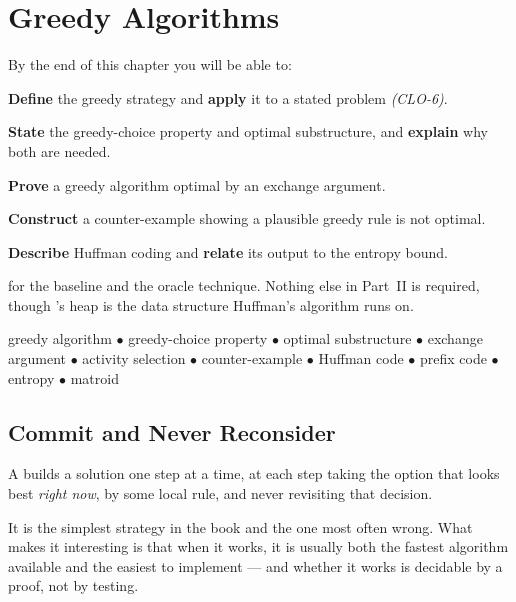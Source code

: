\chapter{Greedy Algorithms}\label{ch:greedy}

\begin{outcomes}
By the end of this chapter you will be able to:
\begin{tight}
  \item \textbf{Define} the greedy strategy and \textbf{apply} it to a stated
        problem \emph{(CLO-6)}.
  \item \textbf{State} the greedy-choice property and optimal substructure, and
        \textbf{explain} why both are needed.
  \item \textbf{Prove} a greedy algorithm optimal by an exchange argument.
  \item \textbf{Construct} a counter-example showing a plausible greedy rule is
        not optimal.
  \item \textbf{Describe} Huffman coding and \textbf{relate} its output to the
        entropy bound.
\end{tight}
\end{outcomes}

\begin{prereq}
 for the baseline and the oracle technique. Nothing else in
Part~II is required, though 's heap is the data structure
Huffman's algorithm runs on.
\end{prereq}

\begin{keyterms}
greedy algorithm $\bullet$ greedy-choice property $\bullet$ optimal
substructure $\bullet$ exchange argument $\bullet$ activity selection
$\bullet$ counter-example $\bullet$ Huffman code $\bullet$ prefix code
$\bullet$ entropy $\bullet$ matroid
\end{keyterms}

\section{Commit and Never Reconsider}

\begin{definitionbox}
A  builds a solution one step at a time, at each step
taking the option that looks best \emph{right now}, by some local rule, and
never revisiting that decision.

\smallskip
It is the simplest strategy in the book and the one most often wrong. What
makes it interesting is that when it works, it is usually both the fastest
algorithm available and the easiest to implement --- and whether it works is
decidable by a proof, not by testing.
\end{definitionbox}

